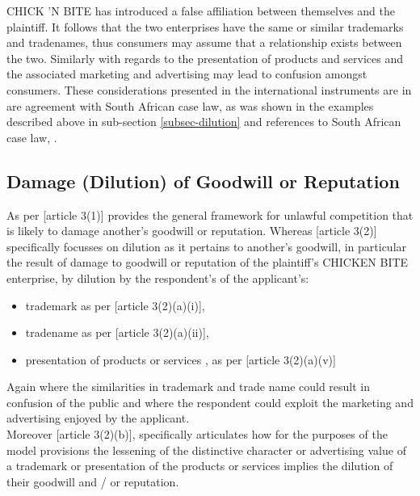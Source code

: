 \documentclass[11pt]{article}
\begin{document}
CHICK 'N BITE has introduced a false affiliation between themselves and the plaintiff. It follows that the two
enterprises have the same or similar trademarks and tradenames, thus consumers may assume that a relationship exists
between the two. Similarly with regards to the presentation of products and services and the associated marketing and
advertising may lead to confusion amongst consumers.
These considerations presented in the international instruments are in are
agreement with South African case law, as was shown in the examples described above in sub-section \ref{subsec-dilution} and references to South African case law, \cite{dijkhorst81_atlas_v_pikkewyn,joffe94_fifa_bartlett,holmes77_capital_v_holiday}.

\subsection{Damage (Dilution) of Goodwill or Reputation}
\label{sec:org821c140}
As per [article 3(1)]\cite{wipo96_model_provi_unfair_comp} provides the general framework for unlawful competition that is
likely to damage another's goodwill or reputation. Whereas [article 3(2)]\cite{wipo96_model_provi_unfair_comp}
specifically focusses on dilution as it pertains to another's goodwill, in particular the result of damage to
goodwill or reputation of the plaintiff's CHICKEN BITE enterprise, by dilution by the respondent's of the applicant's:
\begin{itemize}
\item trademark as per [article 3(2)(a)(i)]\cite{wipo96_model_provi_unfair_comp},
\item tradename as per [article 3(2)(a)(ii)]\cite{wipo96_model_provi_unfair_comp},
\item presentation of products or services , as per [article 3(2)(a)(v)]\cite{wipo96_model_provi_unfair_comp}
\end{itemize}

Again where the similarities in trademark and trade name could result in
confusion of the public and where the respondent could exploit the marketing and
advertising enjoyed by the applicant.\\

Moreover [article 3(2)(b)]\cite{wipo96_model_provi_unfair_comp}, specifically
articulates how for the purposes of the model provisions the lessening of the
distinctive character or advertising value of a trademark or presentation of the
products or services implies the dilution of their goodwill and / or
reputation.\\
\end{document}
